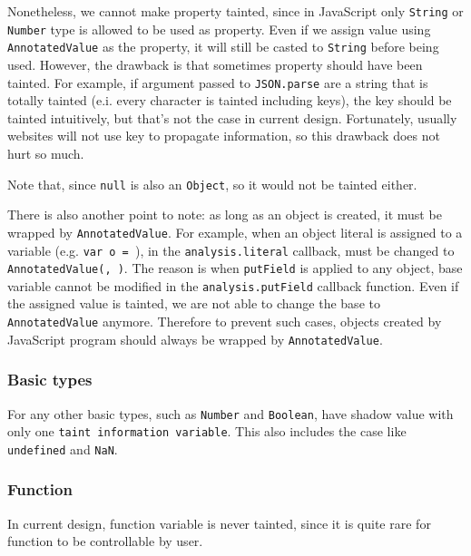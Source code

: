 Nonetheless, we cannot make property tainted, since in JavaScript only \texttt{String} or \texttt{Number} type is allowed to be used as property. Even if we assign value using \texttt{AnnotatedValue} as the property, it will still be casted to \texttt{String} before being used. However, the drawback is that sometimes property should have been tainted. For example, if argument passed to \texttt{JSON.parse} are a string that is totally tainted (e.i. every character is tainted including keys), the key should be tainted intuitively, but that's not the case in current design. Fortunately, usually websites will not use key to propagate information, so this drawback does not hurt so much.

Note that, since \texttt{null} is also an \texttt{Object}, so it would not be tainted either.

There is also another point to note: as long as an object is created, it must be wrapped by \texttt{AnnotatedValue}. For example, when an object literal is assigned to a variable (e.g. \texttt{var o = {}}), in the \texttt{analysis.literal} callback, \texttt{{}} must be changed to \texttt{AnnotatedValue({}, {})}. The reason is when \texttt{putField} is applied to any object, base variable cannot be modified in the \texttt{analysis.putField} callback function. Even if the assigned value is tainted, we are not able to change the base to \texttt{AnnotatedValue} anymore. Therefore to prevent such cases, objects created by JavaScript program should always be wrapped by \texttt{AnnotatedValue}.  

\subsubsection{Basic types}

For any other basic types, such as \texttt{Number} and \texttt{Boolean}, have shadow value with only one \texttt{taint information variable}. This also includes the case like \texttt{undefined} and \texttt{NaN}.

\subsubsection{Function}

In current design, function variable is never tainted, since it is quite rare for function to be controllable by user.

